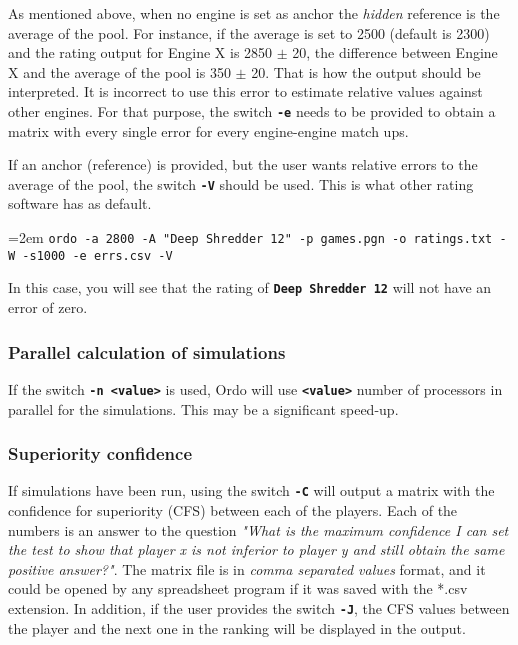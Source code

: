 \documentclass[12pt]{article}
\newcommand{\swtch} [1] {\texttt{\textbf{#1}}}
\newcommand{\cmdln}[1]{
	\par
	\begingroup
		\leftskip=2em
		\addtolength{\rightskip}{0em}
		\noindent \small{\texttt{#1}}
		\par
	\endgroup
}
\begin{document}
As mentioned above, when no engine is set as anchor the \textit{hidden} reference is the average of the pool. 
For instance, if the average is set to 2500 (default is 2300) and the rating output for Engine X is 2850 $\pm$ 20, the difference between Engine X and the average of the pool is 350 $\pm$ 20. 
That is how the output should be interpreted. 
It is incorrect to use this error to estimate relative values against other engines. 
For that purpose, the switch \swtch{-e} needs to be provided to obtain a matrix with every single error for every engine-engine match ups.

If an anchor (reference) is provided, but the user wants relative errors to the average of the pool, the switch \swtch{-V} should be used. 
This is what other rating software has as default.

\cmdln{ordo -a 2800 -A "Deep Shredder 12" -p games.pgn -o ratings.txt -W -s1000 -e errs.csv -V}

In this case, you will see that the rating of \swtch{Deep Shredder 12} will not have an error of zero.

\subsubsection*{Parallel calculation of simulations}

If the switch \swtch{-n <value>} is used, Ordo will use \swtch{<value>} number of processors in parallel for the simulations.
This may be a significant speed-up.

\subsubsection*{Superiority confidence}

If simulations have been run, using the switch \swtch{-C} will output a matrix with the confidence for superiority (CFS) between each of the players.
Each of the numbers is an answer to the question \textit{"What is the maximum confidence I can set the test to show that player x is not inferior to player y and still obtain the same positive answer?"}.
The matrix file is in \textit{comma separated values} format, and it could be opened by any spreadsheet program if it was saved with the *.csv extension.
In addition, if the user provides the switch \swtch{-J}, the CFS values between the player and the next one in the ranking will be displayed in the output.
\end{document}

